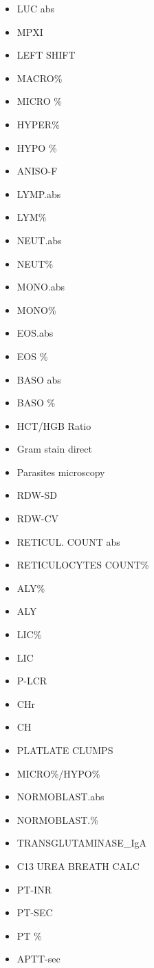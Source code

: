 \documentclass[a4paper,12pt]{article}
\begin{document}
\begin{appendices}
\begin{itemize}
   			\item LUC abs
   			\item MPXI
   			\item LEFT SHIFT
   			\item MACRO\%
   			\item MICRO \%
   			\item HYPER\%
   			\item HYPO \%
   			\item ANISO-F
   			\item LYMP.abs
   			\item LYM\%
   			\item NEUT.abs
   			\item NEUT\%
   			\item MONO.abs
   			\item MONO\%
   			\item EOS.abs
   			\item EOS \%
   			\item BASO abs
   			\item BASO \%
   			\item HCT/HGB Ratio
   			\item Gram stain direct
   			\item Parasites microscopy
   			\item RDW-SD
   			\item RDW-CV
   			\item RETICUL. COUNT abs
   			\item RETICULOCYTES COUNT\%
   			\item ALY\%
   			\item ALY
   			\item LIC\%
   			\item LIC
   			\item P-LCR
   			\item CHr
   			\item CH
   			\item PLATLATE CLUMPS
   			\item MICRO\%/HYPO\%
   			\item NORMOBLAST.abs
   			\item NORMOBLAST.\%
   			\item TRANSGLUTAMINASE\_IgA
   			\item C13 UREA BREATH CALC
   			\item PT-INR
   			\item PT-SEC
   			\item PT \%
   			\item APTT-sec

\end{itemize}
\end{appendices}
\end{document}
